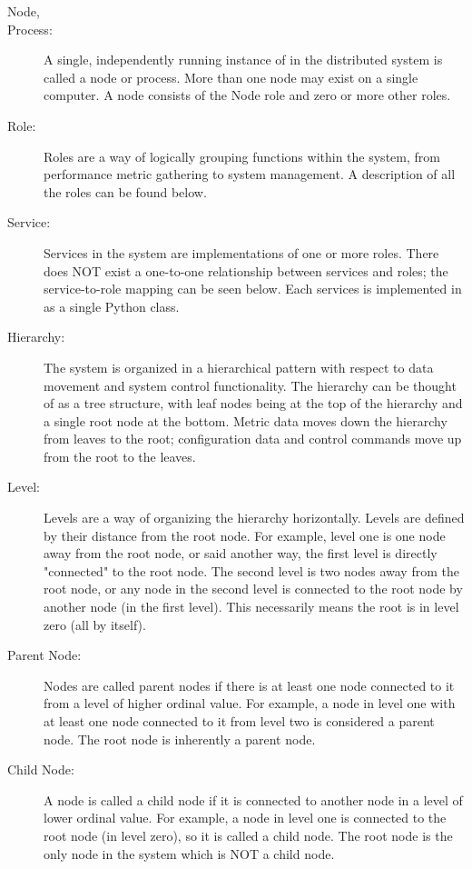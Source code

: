 \begin{description}
\item[\dcamp Node,]
\item[\dcamp Process:]
A single, independently running instance of \dcamp in the distributed system is called a \dcamp node or process. More
than one node may exist on a single computer. A node consists of the Node role and zero or more other \dcamp roles. 

\item[\dcamp Role:]
Roles are a way of logically grouping functions within the \newline \dcamp system, from performance metric gathering to
\dcamp system management. A description of all the \dcamp roles can be found below. 

\item[\dcamp Service:]
Services in the \dcamp system are implementations of one or more \dcamp roles. There does NOT exist a one-to-one
relationship between services and roles; the \dcamp service-to-role mapping can be seen below. Each services is
implemented in \dcamp as a single Python class. 

\item[\dcamp Hierarchy:]
The \dcamp system is organized in a hierarchical pattern with respect to data movement and system control functionality.
The hierarchy can be thought of as a tree structure, with leaf nodes being at the top of the hierarchy and a single root
node at the bottom. Metric data moves down the hierarchy from leaves to the root; configuration data and control
commands move up from the root to the leaves. 

\item[\dcamp Level:]
Levels are a way of organizing the \dcamp hierarchy horizontally. Levels are defined by their distance from the root
node. For example, level one is one node away from the root node, or said another way, the first level is directly
"connected" to the root node. The second level is two nodes away from the root node, or any node in the second level is
connected to the root node by another node (in the first level). This necessarily means the root is in level zero (all
by itself). 

\item[Parent Node:]
Nodes are called parent nodes if there is at least one node connected to it from a level of higher ordinal value. For
example, a node in level one with at least one node connected to it from level two is considered a parent node. The
root node is inherently a parent node. 

\item[Child Node:]
A node is called a child node if it is connected to another node in a level of lower ordinal value. For example, a node
in level one is connected to the root node (in level zero), so it is called a child node. The root node is the only
node in the \dcamp system which is NOT a child node. 


\end{description}
